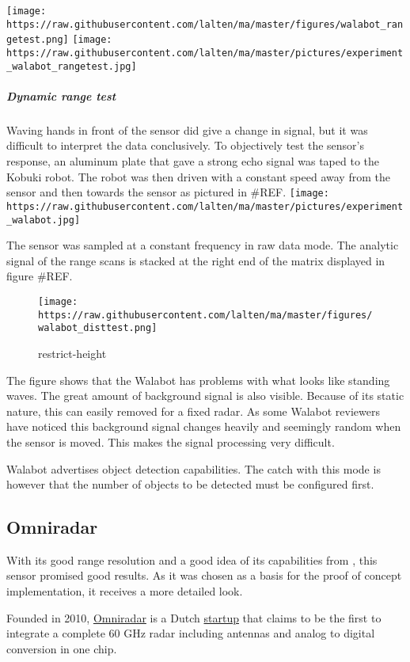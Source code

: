 \texttt{[image: https://raw.githubusercontent.com/lalten/ma/master/figures/walabot\_rangetest.png]}
\texttt{[image: https://raw.githubusercontent.com/lalten/ma/master/pictures/experiment\_walabot\_rangetest.jpg]}

\subparagraph{Dynamic range test}\label{dynamic-range-test}

Waving hands in front of the sensor did give a change in signal, but it
was difficult to interpret the data conclusively. To objectively test
the sensor's response, an aluminum plate that gave a strong echo signal
was taped to the Kobuki robot. The robot was then driven with a constant
speed away from the sensor and then towards the sensor as pictured in
\#REF.
\texttt{[image: https://raw.githubusercontent.com/lalten/ma/master/pictures/experiment\_walabot.jpg]}

The sensor was sampled at a constant frequency in raw data mode. The
analytic signal of the range scans is stacked at the right end of the
matrix displayed in figure \#REF.

\begin{figure}
\centering
\texttt{[image: https://raw.githubusercontent.com/lalten/ma/master/figures/walabot\_disttest.png]}
\caption{restrict-height}
\end{figure}

The figure shows that the Walabot has problems with what looks like
standing waves. The great amount of background signal is also visible.
Because of its static nature, this can easily removed for a fixed radar.
As some Walabot reviewers have noticed \cite{Valens2016} this background
signal changes heavily and seemingly random when the sensor is moved.
This makes the signal processing very difficult.

Walabot advertises object detection capabilities. The catch with this
mode is however that the number of objects to be detected must be
configured first.

\subsection{Omniradar}\label{omniradar}

With its good range resolution and a good idea of its capabilities from
\cite{Ernst2016}, this sensor promised good results. As it was chosen as
a basis for the proof of concept implementation, it receives a more
detailed look.

Founded in 2010, \href{https://www.omniradar.com/}{Omniradar} is a Dutch
\href{https://www.crunchbase.com/organization/omniradar}{startup} that
claims to be the first to integrate a complete 60 GHz radar including
antennas and analog to digital conversion in one chip.

